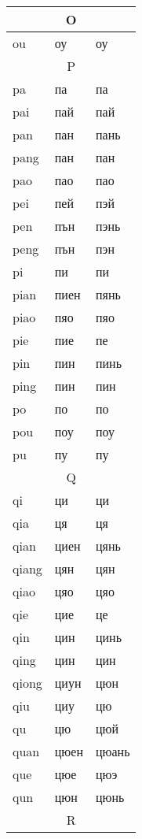 \begin{longtable}{|l|l|l|}
\hline

\multicolumn{3}{|c|}{O} \\ \hline

ou &оу &оу \\ 

\hline

\multicolumn{3}{|c|}{P} \\ \hline

pa &па &па \\
pai &пай &пай
\\pan &пан &пань
\\pang &пан &пан
\\pao &пао &пао
\\pei &пей &пэй
\\pen &пън &пэнь
\\peng &пън &пэн
\\pi &пи &пи
\\pian &пиен &пянь
\\piao &пяо &пяо
\\pie &пие &пе
\\pin &пин &пинь
\\ping &пин &пин
\\po &по &по
\\pou &поу &поу
\\pu &пу &пу
\\
\hline

\multicolumn{3}{|c|}{Q} \\ \hline

qi &ци &ци \\
qia &ця &ця
\\qian &циен &цянь
\\qiang &цян &цян
\\qiao &цяо &цяо
\\qie &цие &це
\\qin &цин &цинь
\\qing &цин &цин
\\qiong &циун &цюн
\\qiu &циу &цю
\\qu &цю &цюй
\\quan &цюен &цюань
\\que &цюе &цюэ
\\qun &цюн &цюнь
\\

\hline

\multicolumn{3}{|c|}{R} \\ \hline


\end{longtable}
